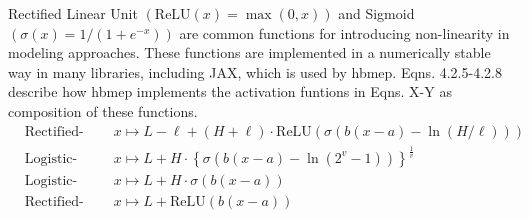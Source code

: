 \documentclass[a4paper,12pt]{article}
\begin{document}
    Rectified Linear Unit $\left(\text{ReLU}\left(x\right) = \max\left(0, x\right)\right)$ and Sigmoid $\left(\sigma\left(x\right) = 1 / \left(1 + e^{-x}\right)\right)$ are common functions for introducing non-linearity in modeling approaches. These functions are implemented in a numerically stable way in many libraries, including JAX, which is used by hbmep. Eqns. 4.2.5-4.2.8 describe how hbmep implements the activation funtions in Eqns. X-Y as composition of these functions.
    \begin{align*}
        &\text{Rectified-logistic} &\;\;&x \mapsto L - \ell + \left(H + \ell\right)\cdot\text{ReLU}\left(\sigma\left(b\left(x - a\right) - \ln\left(H / \ell\right)\right)\right)\tag{4.7.1}\\
        &\text{Logistic-5} &\;\;&x \mapsto L + H\cdot \left\{\sigma\left(b\left(x - a\right) - \ln\left(2^v - 1\right)\right)\right\}^{\frac1v} \tag{4.7.1}\\
        &\text{Logistic-4} &\;\;&x \mapsto L + H\cdot\sigma\left(b\left(x - a\right)\right)  \tag{4.7.2}\\
        &\text{Rectified-linear} &\;\;&x \mapsto L + \text{ReLU}\left(b\left(x - a\right)\right) \tag{4.7.3}\\
    \end{align*}
\end{document}
